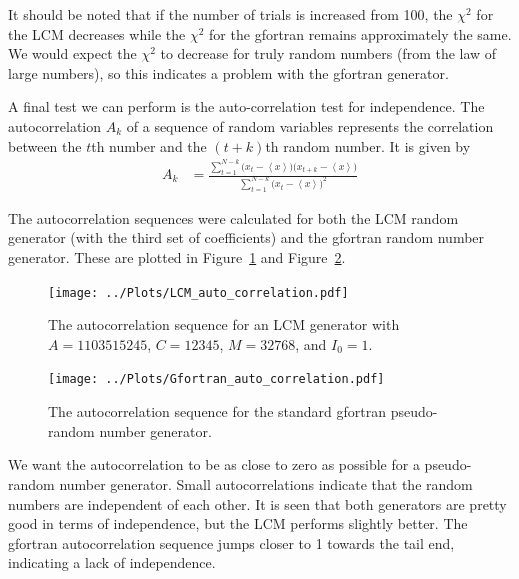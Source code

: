 \documentclass[twocolumn]{myarticle}
\begin{document}
It should be noted that if the number of trials is increased from 100, the $ \chi^2 $ for the LCM decreases while the $ \chi^2 $ for the gfortran remains approximately the same.
We would expect the $ \chi^2 $ to decrease for truly random numbers (from the law of large numbers), so this indicates a problem with the gfortran generator.

A final test we can perform is the auto-correlation test for independence.
The autocorrelation $ A_k $ of a sequence of random variables represents the correlation between the $ t $th number and the $ (t+k) $th random number.
It is given by
\begin{align}
    A_k &= \frac{\displaystyle \sum_{t=1}^{N-k}\big(x_t - \left\langle x \right\rangle\big)\big( x_{t+k} - \left\langle x \right\rangle \big)}{\displaystyle \sum_{t=1}^{N-k} \big( x_t - \left\langle x \right\rangle \big)^2}
\end{align}

The autocorrelation sequences were calculated for both the LCM random generator (with the third set of coefficients) and the gfortran random number generator.
These are plotted in Figure~\ref{fig:lcm_auto_correlation} and Figure~\ref{fig:gfortran_auto_correlation}.

\begin{figure}[ht!]
    \begin{center}
    \texttt{[image: ../Plots/LCM\_auto\_correlation.pdf]}
    \caption{%
        The autocorrelation sequence for an LCM generator with $ A = 1103515245 $, $ C = 12345 $, $ M = 32768 $, and $ I_0 = 1 $.
    }
    \label{fig:lcm_auto_correlation}
    \end{center}
\end{figure}

\begin{figure}[ht!]
    \begin{center}
    \texttt{[image: ../Plots/Gfortran\_auto\_correlation.pdf]}
    \caption{%
        The autocorrelation sequence for the standard gfortran pseudo-random number generator. 
    }
    \label{fig:gfortran_auto_correlation}
    \end{center}
\end{figure}

We want the autocorrelation to be as close to zero as possible for a pseudo-random number generator.
Small autocorrelations indicate that the random numbers are independent of each other.
It is seen that both generators are pretty good in terms of independence, but the LCM performs slightly better.
The gfortran autocorrelation sequence jumps closer to 1 towards the tail end, indicating a lack of independence.
\end{document}
